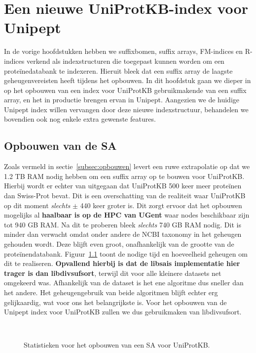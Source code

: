\chapter{Een nieuwe UniProtKB-index voor Unipept}\label{ch:een-nieuwe-uniprotkb-index-voor-unipept}
In de vorige hoofdstukken hebben we suffixbomen, suffix arrays, FM-indices en R-indices verkend als indexstructuren die toegepast kunnen worden om een proteïnedatabank te indexeren.
Hieruit bleek dat een suffix array de laagste geheugenvereisten heeft tijdens het opbouwen.
In dit hoofdstuk gaan we dieper in op het opbouwen van een index voor UniProtKB gebruikmakende van een suffix array, en het in productie brengen ervan in Unipept.
Aangezien we de huidige Unipept index willen vervangen door deze nieuwe indexstructuur, behandelen we bovendien ook nog enkele extra gewenste features.

\section{Opbouwen van de SA}\label{sec:opbouwen-van-de-sa}
Zoals vermeld in sectie~\ref{subsec:opbouwen} levert een ruwe extrapolatie op dat we 1.2 TB RAM nodig hebben om een suffix array op te bouwen voor UniProtKB\@.
Hierbij wordt er echter van uitgegaan dat UniProtKB 500 keer meer proteïnen dan Swiss-Prot bevat.
Dit is een overschatting van de realiteit waar UniProtKB op dit moment \textit{slechts} $\pm$ 440 keer groter is.
Dit zorgt ervoor dat het opbouwen mogelijks al \textbf{haalbaar is op de HPC van UGent} waar nodes beschikbaar zijn tot 940 GB RAM\@.
Na dit te proberen bleek \textit{slechts} 740 GB RAM nodig.
Dit is minder dan verwacht omdat onder andere de NCBI taxonomy in het geheugen gehouden wordt.
Deze blijft even groot, onafhankelijk van de grootte van de proteïnendatabank.
Figuur~\ref{fig:build_uniprot} toont de nodige tijd en hoeveelheid geheugen om dit te realiseren.
\textbf{Opvallend hierbij is dat de libsais implementatie hier trager is dan libdivsufsort}, terwijl dit voor alle kleinere datasets net omgekeerd was.
Afhankelijk van de dataset is het ene algoritme dus sneller dan het andere.
Het geheugengebruik van beide algoritmen blijft echter erg gelijkaardig, wat voor ons het belangrijkste is.
Voor het opbouwen van de Unipept index voor UniProtKB zullen we dus gebruikmaken van libdivsufsort.
\\
\begin{figure}[H]
    \centering
    \\[4ex] %

    \caption{Statistieken voor het opbouwen van een SA voor UniProtKB.}\label{fig:build_uniprot}
\end{figure}

